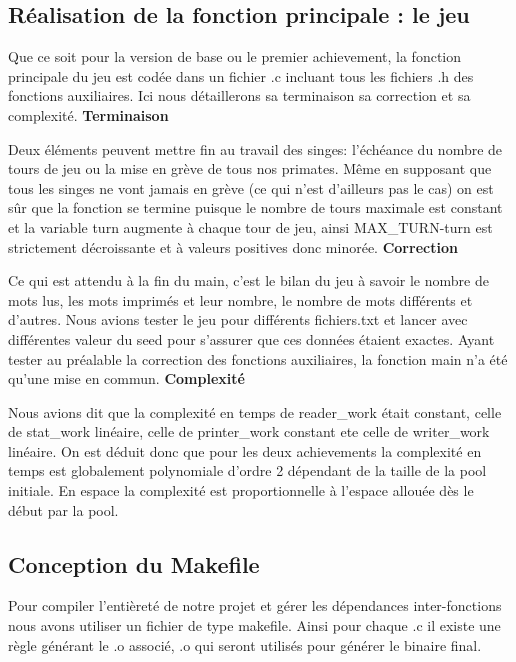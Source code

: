 \documentclass[12pt]{article}
\begin{document}
\subsection{Réalisation de la fonction principale : le jeu}
Que ce soit pour la version de base ou le premier achievement, la fonction principale du jeu est codée dans un fichier .c incluant tous les fichiers .h des fonctions auxiliaires. Ici nous détaillerons sa terminaison sa correction et sa complexité.
\bigbreak
\textbf{Terminaison}
\bigbreak

Deux éléments peuvent mettre fin au travail des singes: l'échéance du nombre de tours de jeu ou la mise en grève de tous nos primates. Même en supposant que tous les singes ne vont jamais en grève (ce qui n'est d'ailleurs pas le cas) on est sûr que la fonction se termine puisque le nombre de tours maximale est constant et la variable turn augmente à chaque tour de jeu, ainsi MAX\_TURN-turn est strictement décroissante et à valeurs positives donc minorée.
\bigbreak
\textbf{Correction}
\bigbreak

Ce qui est attendu à la fin du main, c'est le bilan du jeu à savoir le nombre de mots lus, les mots imprimés et leur nombre, le nombre de mots différents et d'autres.
Nous avions tester le jeu pour différents fichiers.txt et lancer avec différentes valeur du seed pour s'assurer que ces données étaient exactes. Ayant tester au préalable la correction des fonctions auxiliaires, la fonction main n'a été qu'une mise en commun.
\bigbreak
\bigbreak
\bigbreak
\textbf{Complexité}
\bigbreak

Nous avions dit que la complexité en temps de reader\_work était constant, celle de stat\_work linéaire, celle de printer\_work constant ete celle de writer\_work linéaire. On est déduit donc que pour les deux achievements la complexité en temps est globalement polynomiale d'ordre 2 dépendant de la taille de la pool initiale. En espace la complexité est proportionnelle à l'espace allouée dès le début par la pool.

\subsection{Conception du Makefile}
Pour compiler l'entièreté de notre projet et gérer les dépendances inter-fonctions nous avons utiliser un fichier de type makefile. Ainsi pour chaque .c il existe une règle générant le .o associé, .o qui seront utilisés pour générer le binaire final.
\end{document}
